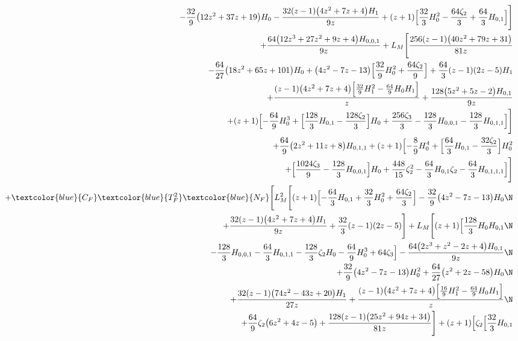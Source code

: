 \begin{eqnarray}
\nonumber\\&&
-\frac{32}{9} \big(12 z^2+37 z+19\big) H_0
-\frac{32 (z-1) \big(4 z^2+7 z+4\big) H_1}{9 z}+(z+1) \Bigl[\frac{32}{3}H_0^2-\frac{64 \zeta_2}{3}+\frac{64}{3} H_{0,1}\Bigr]\Biggr]
\nonumber\\&&
+\frac{64 \big(12 z^3+27 z^2+9 z+4\big) H_{0,0,1}}{9 z}
+L_M \Biggl[\frac{256 (z-1) \big(40 z^2+79  z+31\big)}{81 z}
\nonumber\\&&
-\frac{64}{27} \big(18 z^2+65 z+101\big) H_0+\big(4 z^2-7 z-13\big) \Bigl[\frac{32}{9} H_0^2+\frac{64 \zeta_2}{9}\Bigr]+\frac{64}{3} (z-1) (2 z-5) H_1
\nonumber\\&&
+\frac{(z-1) \big(4 z^2+7 z+4\big) \Bigl[\frac{32}{9} H_1^2-\frac{64}{9} H_0
  H_1\Bigr]}{z}+\frac{128 \big(5 z^2+5 z-2\big) H_{0,1}}{9 z}
\nonumber\\&&
+(z+1) \Bigl[-\frac{64}{9} H_0^3+\Bigl[\frac{128}{3} H_{0,1}-\frac{128
  \zeta_2}{3}\Bigr] H_0+\frac{256 \zeta_3}{3}-\frac{128}{3}
H_{0,0,1}-\frac{128}{3} H_{0,1,1}\Bigr]\Biggr]
\nonumber\\&&
+\frac{64}{9} \big(2 z^2+11 z+8\big) H_{0,1,1}+(z+1) \Bigl[-\frac{8}{9}
H_0^4+\Bigl[\frac{64}{3} H_{0,1}-\frac{32 \zeta_2}{3}\Bigr] H_0^2
\nonumber\\&&
+\Bigl[\frac{1024 \zeta_3}{9}-\frac{128}{3} H_{0,0,1}\Bigr]
H_0+\frac{448}{15} \zeta_2^2-\frac{64}{3} H_{0,1} \zeta_2-\frac{64}{3} H_{0,1,1,1}\Bigr]
\Biggr]
\nonumber\\&&
+\textcolor{blue}{C_F} \textcolor{blue}{T_F^2} \textcolor{blue}{N_F} \Biggl[
L_M^2 \Biggl[
(z+1) \Bigl[
-\frac{64}{3} H_{0,1}
+\frac{32}{3} H_0^2
+\frac{64 \zeta_2}{3}
\Bigr]
-\frac{32}{9} \big(4 z^2-7 z-13\big) H_0
\N\\&&
+\frac{32 (z-1) \big(4 z^2+7 z+4\big) H_1}{9 z}
+\frac{32}{3} (z-1) (2 z-5)\Biggr]
+L_M \Biggl[
(z+1) \Bigl[
\frac{128}{3} H_0 H_{0,1}
\N\\&&
-\frac{128}{3} H_{0,0,1}
-\frac{64}{3} H_{0,1,1}
-\frac{128}{3} \zeta_2 H_0
-\frac{64}{9} H_0^3
+64 \zeta_3
\Bigr]
-\frac{64 \big(2 z^3+z^2-2 z+4\big) H_{0,1}}{9 z}
\N\\&&
+\frac{32}{9} \big(4 z^2-7 z-13\big) H_0^2
+\frac{64}{27} \big(z^2+2 z-58\big) H_0
\N\\&&
+\frac{32 (z-1) \big(74 z^2-43 z+20\big) H_1}{27 z}
+\frac{(z-1) \big(4 z^2+7 z+4\big) \Bigl[
\frac{16}{9} H_1^2
-\frac{64}{9} H_0 H_1
\Bigr]}{z}
\N\\&&
+\frac{64}{9} \zeta_2 \big(6 z^2+4 z-5\big)
+\frac{128 (z-1) \big(25 z^2+94 z+34\big)}{81 z}
\Biggr]
+(z+1) \Bigl[
\zeta_2 \Bigl[
\frac{32}{3} H_{0,1}

\end{eqnarray}
